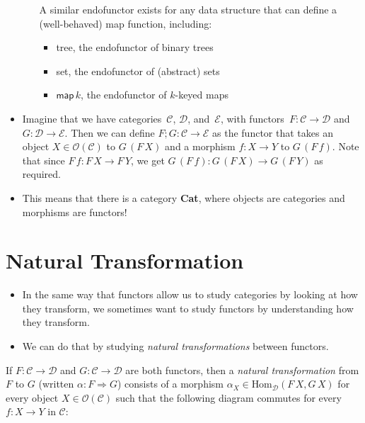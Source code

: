 \documentclass{lecturenotes}
\newcommand{\obj}[1]{\ensuremath{\mathcal{O}(#1)}}
\renewcommand{\hom}[3][]{\ensuremath{\text{Hom}_{#1}(#2, #3)}}
\renewcommand{\Cat}{\textbf{Cat}\xspace}
\begin{document}
\begin{itemize}
\begin{itemize}
    A similar endofunctor exists for any data structure that can define a (well-behaved) \textsf{map} function, including:
    \begin{itemize}
    \item \textsf{tree}, the endofunctor of binary trees
    \item \textsf{set}, the endofunctor of (abstract) sets
    \item $\textsf{map}\,k$, the endofunctor of $k$-keyed maps
    \end{itemize}
  \end{itemize}
\item Imagine that we have categories~$\mathcal{C}$, $\mathcal{D}$, and~$\mathcal{E}$, with functors~$F : \mathcal{C} \to \mathcal{D}$ and~$G : \mathcal{D} \to \mathcal{E}$.
  Then we can define $F; G : \mathcal{C} \to \mathcal{E}$ as the functor that takes an object $X \in \obj{\mathcal{C}}$ to $G \, (F\, X)$ and a morphism $f : X \to Y$ to $G\,(F\,f)$.
  Note that since $F \, f : F\,X \to F\,Y$, we get $G\, (F\,f) : G\,(F\,X) \to G\,(F\,Y)$ as required.
\item This means that there is a category \Cat, where objects are categories and morphisms are functors!
\end{itemize}

\section{Natural Transformation}
\label{sec:natur-transf}

\begin{itemize}
\item In the same way that functors allow us to study categories by looking at how they transform, we sometimes want to study functors by understanding how they transform.
\item We can do that by studying \emph{natural transformations} between functors.
\end{itemize}

\begin{defn}
  If $F : \mathcal{C} \to \mathcal{D}$ and $G : \mathcal{C} \to \mathcal{D}$ are both functors, then a \emph{natural transformation} from $F$ to $G$ (written $\alpha : F \Rightarrow G$) consists of a morphism $\alpha_X \in \hom[\mathcal{D}]{F\,X}{G\,X}$ for every object $X \in \obj{\mathcal{C}}$ such that the following diagram commutes for every $f : X \to Y$ in $\mathcal{C}$:
  \begin{center}
  \end{center}
\end{defn}
\end{document}
